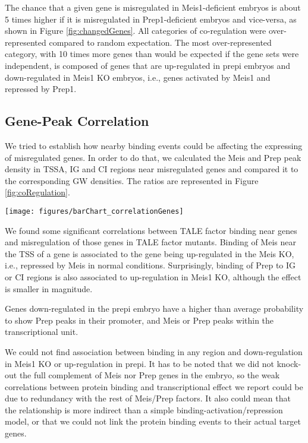 The chance that a given gene is misregulated in Meis1-deficient embryos is about 5 times higher if it is misregulated in Prep1-deficient embryos and vice-versa, as shown in Figure \ref{fig:changedGenes}. All categories of co-regulation were over-represented compared to random expectation. The most over-represented category, with 10 times more genes than would be expected if the gene sets were independent, is composed of genes that are up-regulated in \ac{prepi} embryos and down-regulated in Meis1 \ac{KO} embryos, i.e., genes activated by Meis1 and repressed by Prep1.

\subsection{Gene-Peak Correlation}

We tried to establish how nearby binding events could be affecting the expressing of misregulated genes. In order to do that, we calculated the Meis and Prep peak density in \ac{TSSA}, \ac{IG} and \ac{CI} regions near misregulated genes and compared it to the corresponding \ac{GW} densities. The ratios are represented in Figure \ref{fig:coRegulation}.

\begin{SCfigure}[]
  \centering
  \texttt{[image: figures/barChart\_correlationGenes]}
  \caption[Correlation Between Misregulation and TALE Binding]{\textbf{Correlation Between Misregulation and TALE Binding.} Ratio of Meis and Prep peak density in misregulated gene-associated \ac{TSSA}, \ac{IG} and \ac{CI} regions to the corresponding \ac{GW} averages. Asterisks mark p-value \< $10^{-3}$.}
  \label{fig:coRegulation}
\end{SCfigure}

We found some significant correlations between \ac{TALE} factor binding near genes and misregulation of those genes in \ac{TALE} factor mutants. Binding of Meis near the \ac{TSS} of a gene is associated to the gene being up-regulated in the Meis \ac{KO}, i.e., repressed by Meis in normal conditions. Surprisingly, binding of Prep to \ac{IG} or \ac{CI} regions is also associated to up-regulation in Meis1 \ac{KO}, although the effect is smaller in magnitude. 

Genes down-regulated in the \ac{prepi} embryo have a higher than average probability to show Prep peaks in their promoter, and Meis or Prep peaks within the transcriptional unit. 

We could not find association between binding in any region and down-regulation in Meis1 \ac{KO} or up-regulation in \ac{prepi}. It has to be noted that we did not knock-out the full complement of Meis nor Prep genes in the embryo, so the weak correlations between protein binding and transcriptional effect we report could be due to redundancy with the rest of Meis/Prep factors. It also could mean that the relationship is more indirect than a simple binding-activation/repression model, or that we could not link the protein binding events to their actual target genes. 

